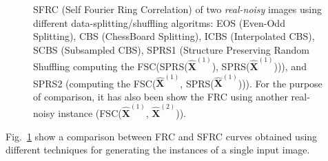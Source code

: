 \documentclass{article}
\begin{document}
\begin{figure}
  \centering
  \caption{SFRC (Self Fourier Ring Correlation) of two
    \emph{real-noisy} images \cite{zhang2019poisson} using different
    data-splitting/shuffling algoritms: EOS (Even-Odd Splitting), CBS
    (ChessBoard Splitting), ICBS (Interpolated CBS), SCBS (Subsampled
    CBS), SPRS1 (Structure Preserving Random Shuffling computing the
    FSC(SPRS($\hat{\mathbf{X}}^{(1)}$),
    SPRS($\hat{\mathbf{X}}^{(1)}$))), and SPRS2 (computing the
    FSC($\hat{\mathbf{X}}^{(1)}$,
    SPRS($\hat{\mathbf{X}}^{(1)}$))). For the purpose of comparison,
    it has also been show the FRC using another real-noisy instance
    (FSC($\hat{\mathbf{X}}^{(1)}$,
    $\hat{\mathbf{X}}^{(2)}$)).\label{fig:SFC_vs_splitting_noisy}}
\end{figure}

Fig.~\ref{fig:SFC_vs_splitting_noisy} show a comparison between FRC
and SFRC curves obtained using different techniques for generating the
instances of a single input image.
\end{document}
